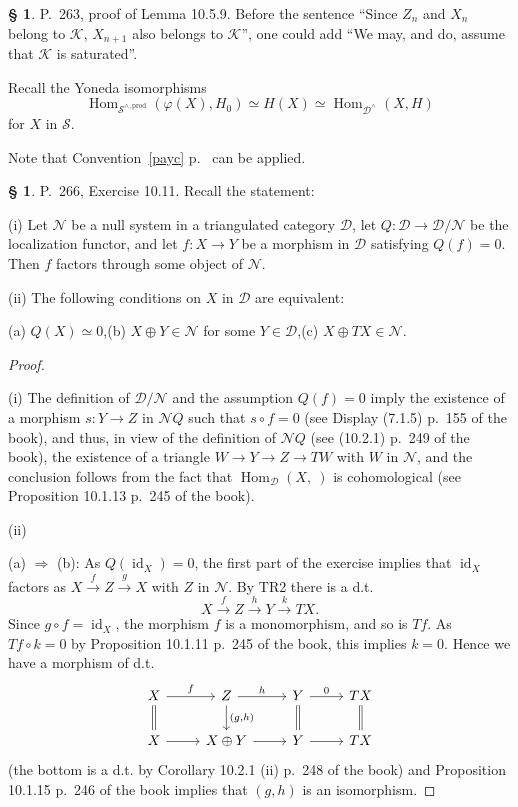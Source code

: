 \documentclass[12pt]{article}%
\theoremstyle{remark}
\theoremstyle{definition}
\newtheorem{s}[thm]{\S}%
\newcommand{\nn}{\noindent}
\newcommand{\cc}{\mathcal}
\newcommand{\pp}{\varphi}
\newcommand{\then}{\Rightarrow}
\newcommand{\xr}{\xrightarrow}
\DeclareMathOperator{\id}{id}
\DeclareMathOperator{\Hom}{Hom}%
\begin{document}

\begin{s} P.~263, proof of Lemma 10.5.9. Before the sentence ``Since $Z_n$ and $X_n$ belong to $\cc K$, $X_{n+1}$ also belongs to $\cc K$'', one could add ``We may, and do, assume that $\cc K$ is saturated''.

Recall the Yoneda isomorphisms 
$$
\Hom_{\cc S^{\wedge,\text{prod}}}(\pp(X),H_0)\simeq H(X)\simeq\Hom_{\cc D^\wedge}(X,H)
$$ 
for $X$ in $\cc S$.

Note that Convention~\ref{payc} p.~\pageref{payc} can be applied.
\end{s}


\begin{s} P.~266, Exercise 10.11. Recall the statement: 

\nn(i) Let $\cc N$ be a null system in a triangulated category $\cc D$, let $Q:\cc D\to\cc D/\cc N$ be the localization functor, and let $f:X\to Y$ be a morphism in $\cc D$ satisfying $Q(f)=0$. Then $f$ factors through some object of $\cc N$. 

\nn(ii) The following conditions on $X$ in $\cc D$ are equivalent: 

\nn(a) $Q(X)\simeq0$,\quad(b) $X\oplus Y\in\cc N$ for some $Y\in\cc D$,\quad(c) $X\oplus TX\in\cc N$.

\begin{proof}\ 

\nn(i) The definition of $\cc D/\cc N$ and the assumption $Q(f)=0$ imply the existence of a morphism $s:Y\to Z$ in $\cc NQ$ such that $s\circ f=0$ (see Display (7.1.5) p.~155 of the book), and thus, in view of the definition of $\cc NQ$ (see (10.2.1) p.~249 of the book), the existence of a triangle $W\to Y\to Z\to TW$ with $W$ in $\cc N$, and the conclusion follows from the fact that $\Hom_{\cc D}(X,\ )$ is cohomological (see Proposition 10.1.13 p.~245 of the book). 

\nn(ii)

\nn(a) $\then$ (b): As $Q(\id_X)=0$, the first part of the exercise implies that $\id_X$ factors as $X\xr fZ\xr g X$ with $Z$ in $\cc N$. By TR2 there is a d.t. 
$$
X\xr fZ\xr hY\xr kTX.
$$ 
Since $g\circ f=\id_X$, the morphism $f$ is a monomorphism, and so is $Tf$. As $Tf\circ k=0$ by Proposition 10.1.11 p.~245 of the book, this implies $k=0$. Hence we have a morphism of d.t. 
$$
\begin{tikzcd}
X\ar[equal]{d}\ar{r}{f}&Z\ar{d}{(g,h)}\ar{r}{h}&Y\ar[equal]{d}\ar{r}{0}&TX\ar[equal]{d}\\ 
X\ar{r}&X\oplus Y\ar{r}&Y\ar{r}&TX
\end{tikzcd}
$$
(the bottom is a d.t. by Corollary 10.2.1 (ii) p.~248 of the book) and Proposition 10.1.15 p.~246 of the book implies that $(g,h)$ is an isomorphism.\bigskip 


\end{proof}
\end{s}
\end{document}
